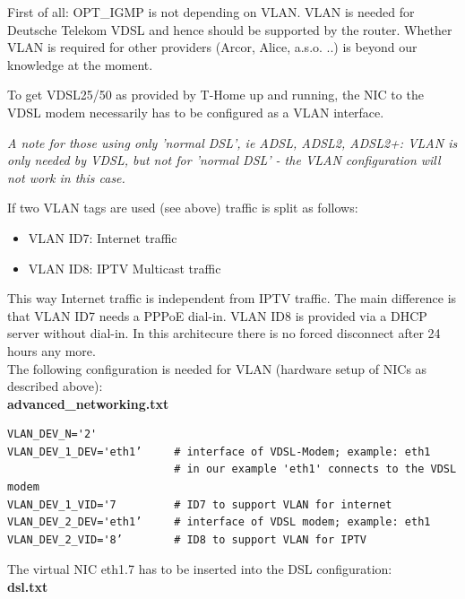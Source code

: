 First of all: OPT\_IGMP is not depending on VLAN. VLAN is needed for Deutsche Telekom VDSL and hence
should be supported by the router. Whether VLAN is required for other providers (Arcor, Alice, a.s.o. ..)
is beyond our knowledge at the moment.

To get VDSL25/50 as provided by T-Home up and running, the NIC to the VDSL modem necessarily has to be
configured as a VLAN interface.

\vspace{3mm}
\emph{A note for those using only 'normal DSL', ie ADSL, ADSL2, ADSL2+: VLAN is only needed by VDSL,
      but not for 'normal DSL' - the VLAN configuration will not work in this case.}
\vspace{3mm}

If two VLAN tags are used (see above) traffic is split as follows:

\begin{itemize}
   \item{VLAN ID7: Internet traffic}
   \item{VLAN ID8: IPTV Multicast traffic}
\end{itemize}

This way Internet traffic is independent from IPTV traffic. The main difference
is that VLAN ID7 needs a PPPoE dial-in. VLAN ID8 is provided via a DHCP server
without dial-in. In this architecure there is no forced disconnect after 24
hours any more.\\

The following configuration is needed for VLAN (hardware setup of NICs as
described above):\\

\noindent \textbf{advanced\_networking.txt}

\begin{example}
\begin{verbatim}
VLAN_DEV_N='2'
VLAN_DEV_1_DEV='eth1’     # interface of VDSL-Modem; example: eth1
                          # in our example 'eth1' connects to the VDSL modem
VLAN_DEV_1_VID='7         # ID7 to support VLAN for internet
VLAN_DEV_2_DEV='eth1’     # interface of VDSL modem; example: eth1
VLAN_DEV_2_VID='8’        # ID8 to support VLAN for IPTV
\end{verbatim}
\end{example}

\noindent The virtual NIC eth1.7 has to be inserted into the DSL configuration:\\

\noindent \textbf{dsl.txt}

